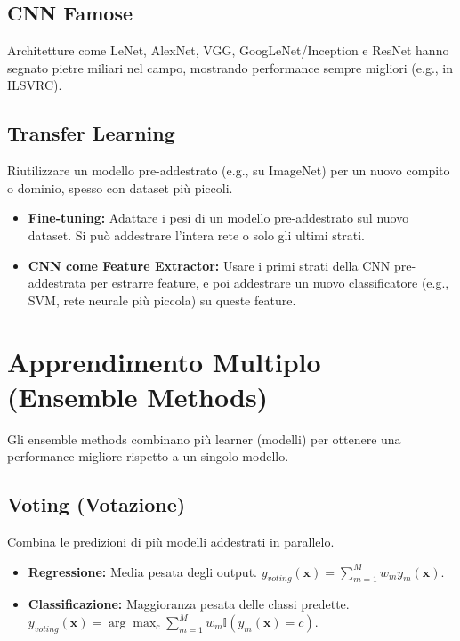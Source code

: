 \documentclass[a4paper,11pt]{article}
\begin{document}
\subsection{CNN Famose}
Architetture come LeNet, AlexNet, VGG, GoogLeNet/Inception e ResNet hanno segnato pietre miliari nel campo, mostrando performance sempre migliori (e.g., in ILSVRC).

\subsection{Transfer Learning}
Riutilizzare un modello pre-addestrato (e.g., su ImageNet) per un nuovo compito o dominio, spesso con dataset più piccoli.
\begin{itemize}
    \item \textbf{Fine-tuning:} Adattare i pesi di un modello pre-addestrato sul nuovo dataset. Si può addestrare l'intera rete o solo gli ultimi strati.
    \item \textbf{CNN come Feature Extractor:} Usare i primi strati della CNN pre-addestrata per estrarre feature, e poi addestrare un nuovo classificatore (e.g., SVM, rete neurale più piccola) su queste feature.
\end{itemize}

\section{Apprendimento Multiplo (Ensemble Methods)}

Gli ensemble methods combinano più learner (modelli) per ottenere una performance migliore rispetto a un singolo modello.

\subsection{Voting (Votazione)}
Combina le predizioni di più modelli addestrati in parallelo.
\begin{itemize}
    \item \textbf{Regressione:} Media pesata degli output. $y_{voting}(\mathbf{x}) = \sum_{m=1}^M w_m y_m(\mathbf{x})$.
    \item \textbf{Classificazione:} Maggioranza pesata delle classi predette. $y_{voting}(\mathbf{x}) = \arg\max_c \sum_{m=1}^M w_m \mathbb{I}(y_m(\mathbf{x}) = c)$.
\end{itemize}
\end{document}
